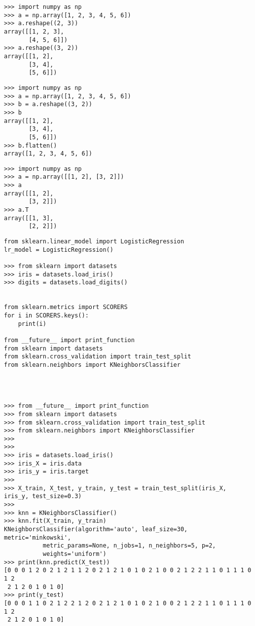\begin{verbatim}
>>> import numpy as np
>>> a = np.array([1, 2, 3, 4, 5, 6])
>>> a.reshape((2, 3))
array([[1, 2, 3],
       [4, 5, 6]])
>>> a.reshape((3, 2))
array([[1, 2],
       [3, 4],
       [5, 6]])
\end{verbatim}

\begin{verbatim}
>>> import numpy as np
>>> a = np.array([1, 2, 3, 4, 5, 6])
>>> b = a.reshape((3, 2))
>>> b
array([[1, 2],
       [3, 4],
       [5, 6]])
>>> b.flatten()
array([1, 2, 3, 4, 5, 6])
\end{verbatim}

\begin{verbatim}
>>> import numpy as np
>>> a = np.array([[1, 2], [3, 2]])
>>> a
array([[1, 2],
       [3, 2]])
>>> a.T
array([[1, 3],
       [2, 2]])
\end{verbatim}


\begin{verbatim}
from sklearn.linear_model import LogisticRegression
lr_model = LogisticRegression()

>>> from sklearn import datasets
>>> iris = datasets.load_iris()
>>> digits = datasets.load_digits()


from sklearn.metrics import SCORERS
for i in SCORERS.keys():
    print(i)

from __future__ import print_function
from sklearn import datasets
from sklearn.cross_validation import train_test_split
from sklearn.neighbors import KNeighborsClassifier




>>> from __future__ import print_function
>>> from sklearn import datasets
>>> from sklearn.cross_validation import train_test_split
>>> from sklearn.neighbors import KNeighborsClassifier
>>> 
>>> 
>>> iris = datasets.load_iris()
>>> iris_X = iris.data
>>> iris_y = iris.target
>>> 
>>> X_train, X_test, y_train, y_test = train_test_split(iris_X, iris_y, test_size=0.3)
>>> 
>>> knn = KNeighborsClassifier()
>>> knn.fit(X_train, y_train)
KNeighborsClassifier(algorithm='auto', leaf_size=30, metric='minkowski',
           metric_params=None, n_jobs=1, n_neighbors=5, p=2,
           weights='uniform')
>>> print(knn.predict(X_test))
[0 0 0 1 2 0 2 1 2 1 1 2 0 2 1 2 1 0 1 0 2 1 0 0 2 1 2 2 1 1 0 1 1 1 0 1 2
 2 1 2 0 1 0 1 0]
>>> print(y_test)
[0 0 0 1 1 0 2 1 2 2 1 2 0 2 1 2 1 0 1 0 2 1 0 0 2 1 2 2 1 1 0 1 1 1 0 1 2
 2 1 2 0 1 0 1 0]
\end{verbatim}

\ifx\engineeringnotes\undefined
    
\fi
